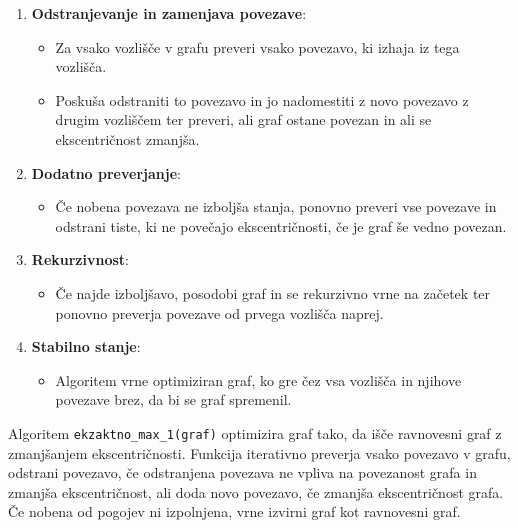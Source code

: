 \documentclass[fin1, tisk]{fmfdelo}
\begin{document}
\begin{enumerate}
    \item \textbf{Odstranjevanje in zamenjava povezave}:
    \begin{itemize}
        \item Za vsako vozlišče v grafu preveri vsako povezavo, ki izhaja iz tega vozlišča.
        \item Poskuša odstraniti to povezavo in jo nadomestiti z novo povezavo z drugim vozliščem ter preveri, ali graf ostane povezan in ali se ekscentričnost zmanjša.
    \end{itemize}
    
    \item \textbf{Dodatno preverjanje}:
    \begin{itemize}
        \item Če nobena povezava ne izboljša stanja, ponovno preveri vse povezave in odstrani tiste, ki ne povečajo ekscentričnosti, če je graf še vedno povezan.
    \end{itemize}
    
    \item \textbf{Rekurzivnost}:
    \begin{itemize}
        \item Če najde izboljšavo, posodobi graf in se rekurzivno vrne na začetek ter ponovno preverja povezave od prvega vozlišča naprej.
    \end{itemize}
    
    \item \textbf{Stabilno stanje}:
    \begin{itemize}
        \item Algoritem vrne optimiziran graf, ko gre čez vsa vozlišča in njihove povezave brez, da bi se graf spremenil.
    \end{itemize}
\end{enumerate}








Algoritem \texttt{ekzaktno\_max\_1(graf)} optimizira graf tako, da išče ravnovesni graf z zmanjšanjem ekscentričnosti. 
Funkcija iterativno preverja vsako povezavo v grafu, odstrani povezavo, če odstranjena povezava ne vpliva na povezanost
grafa in zmanjša ekscentričnost, ali doda novo povezavo, če zmanjša ekscentričnost grafa.
Če nobena od pogojev ni izpolnjena, vrne izvirni graf kot ravnovesni graf.
\end{document}
